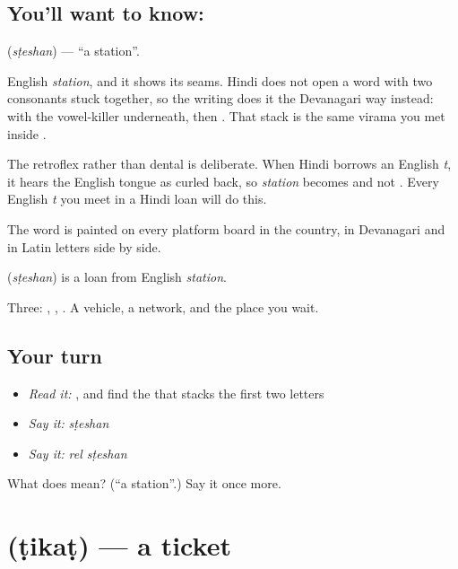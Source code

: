 \subsection*{You'll want to know: }
\textbf{} (\emph{sṭeshan}) — \textquotedblleft{}a station\textquotedblright{}.

English \emph{station}, and it shows its seams. Hindi does not open a word with two consonants stuck together, so the writing does it the Devanagari way instead:  with the vowel-killer  underneath, then . That stack is the same virama you met inside .

The retroflex  rather than dental  is deliberate. When Hindi borrows an English \emph{t}, it hears the English tongue as curled back, so \emph{station} becomes  and not . Every English \emph{t} you meet in a Hindi loan will do this.

The word is painted on every platform board in the country, in Devanagari and in Latin letters side by side.

\begin{cousinweb}
\textbf{} (\emph{sṭeshan}) is a loan from English \emph{station}.
\end{cousinweb}

\begin{grammarlens}[title={What you've built}]
Three: , , . A vehicle, a network, and the place you wait.
\end{grammarlens}

\subsection*{Your turn}
\begin{itemize}
\raggedright
  \item \emph{Read it:} , and find the  that stacks the first two letters
  \item \emph{Say it:} \emph{sṭeshan}
  \item \emph{Say it:} \emph{rel sṭeshan}
\end{itemize}

\begin{tcolorbox}[breakable,colback=teal!4,colframe=teal!35!black,title={Before you move on}]
What does  mean? (\textquotedblleft{}a station\textquotedblright{}.) Say it once more.
\end{tcolorbox}
\section[\texorpdfstring{\hi{टिकट} (ṭikaṭ)}{टिकट (ṭikaṭ)}]{ (ṭikaṭ) — a ticket}

